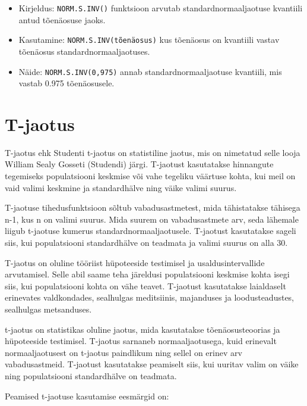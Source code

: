 \documentclass[
]{book}
\providecommand{\tightlist}{%
  \setlength{\itemsep}{0pt}\setlength{\parskip}{0pt}}
\begin{document}
\begin{itemize}
  \begin{itemize}
  \tightlist
  \item
    Kirjeldus: \texttt{NORM.S.INV()} funktsioon arvutab standardnormaaljaotuse kvantiili antud tõenäosuse jaoks.
  \item
    Kasutamine: \texttt{NORM.S.INV(tõenäosus)} kus tõenäosus on kvantiili vastav tõenäosus standardnormaaljaotuses.
  \item
    Näide: \texttt{NORM.S.INV(0,975)} annab standardnormaaljaotuse kvantiili, mis vastab 0.975 tõenäosusele.
  \end{itemize}
\end{itemize}

\section{T-jaotus}\label{t-jaotus}

T-jaotus ehk Studenti t-jaotus on statistiline jaotus, mis on nimetatud selle looja William Sealy Gosseti (Studendi) järgi. T-jaotust kasutatakse hinnangute tegemiseks populatsiooni keskmise või vahe tegeliku väärtuse kohta, kui meil on vaid valimi keskmine ja standardhälve ning väike valimi suurus.

T-jaotuse tihedusfunktsioon sõltub vabadusastmetest, mida tähistatakse tähisega n-1, kus n on valimi suurus. Mida suurem on vabadusastmete arv, seda lähemale liigub t-jaotuse kumerus standardnormaaljaotusele. T-jaotust kasutatakse sageli siis, kui populatsiooni standardhälve on teadmata ja valimi suurus on alla 30.

T-jaotus on oluline tööriist hüpoteeside testimisel ja usaldusintervallide arvutamisel. Selle abil saame teha järeldusi populatsiooni keskmise kohta isegi siis, kui populatsiooni kohta on vähe teavet. T-jaotust kasutatakse laialdaselt erinevates valdkondades, sealhulgas meditsiinis, majanduses ja loodusteadustes, sealhulgas metsanduses.

t-jaotus on statistikas oluline jaotus, mida kasutatakse tõenäosusteoorias ja hüpoteeside testimisel. T-jaotus sarnaneb normaaljaotusega, kuid erinevalt normaaljaotusest on t-jaotus paindlikum ning sellel on erinev arv vabadusastmeid. T-jaotust kasutatakse peamiselt siis, kui uuritav valim on väike ning populatsiooni standardhälve on teadmata.

Peamised t-jaotuse kasutamise eesmärgid on:
\end{document}
